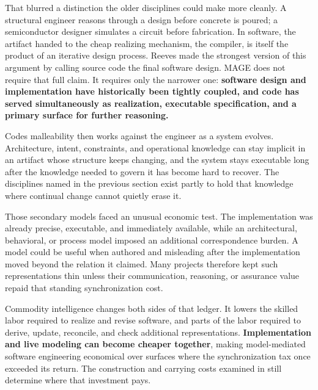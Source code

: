 That blurred a distinction the older disciplines could make more cleanly. A structural engineer reasons through a design before concrete is poured; a semiconductor designer simulates a circuit before fabrication. In software, the artifact handed to the cheap realizing mechanism, the compiler, is itself the product of an iterative design process. Reeves made the strongest version of this argument by calling source code the final software design. MAGE does not require that full claim. It requires only the narrower one: \textbf{software design and implementation have historically been tightly coupled, and code has served simultaneously as realization, executable specification, and a primary surface for further reasoning.}

Code\textquotesingle s malleability then works against the engineer as a system evolves. Architecture, intent, constraints, and operational knowledge can stay implicit in an artifact whose structure keeps changing, and the system stays executable long after the knowledge needed to govern it has become hard to recover. The disciplines named in the previous section exist partly to hold that knowledge where continual change cannot quietly erase it.

Those secondary models faced an unusual economic test. The implementation was already precise, executable, and immediately available, while an architectural, behavioral, or process model imposed an additional correspondence burden. A model could be useful when authored and misleading after the implementation moved beyond the relation it claimed. Many projects therefore kept such representations thin unless their communication, reasoning, or assurance value repaid that standing synchronization cost.


Commodity intelligence changes both sides of that ledger. It lowers the skilled labor required to realize and revise software, and parts of the labor required to derive, update, reconcile, and check additional representations. \textbf{Implementation and live modeling can become cheaper together}, making model-mediated software engineering economical over surfaces where the synchronization tax once exceeded its return. The construction and carrying costs examined in  still determine where that investment pays.

